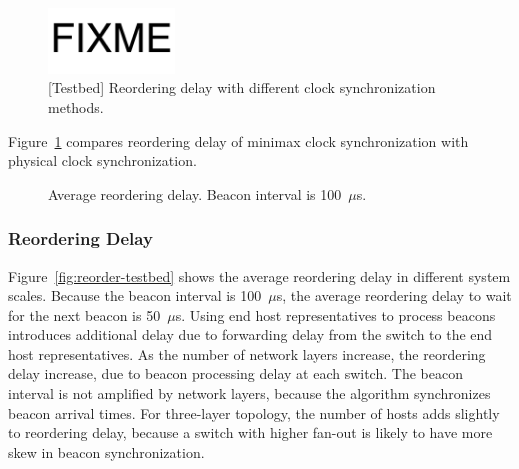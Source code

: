 \begin{figure}[t]
\centering
\includegraphics[width=0.3\textwidth]{images/fixme.pdf}
\caption{[Testbed] Reordering delay with different clock synchronization methods.}
\label{fig:clock-sync}
\end{figure}

Figure~\ref{fig:clock-sync} compares reordering delay of minimax clock synchronization with physical clock synchronization.


\begin{figure}[t]
\centering
	\hspace{0.01\textwidth}
	\caption{Average reordering delay. Beacon interval is 100~$\mu$s.}
    \vspace{-5pt}
\label{fig:reorder-delay}
\end{figure}

\subsubsection{Reordering Delay}
\label{sec:eval-delay}

Figure~\ref{fig:reorder-testbed} shows the average reordering delay in different system scales.
Because the beacon interval is 100~$\mu$s, the average reordering delay to wait for the next beacon is 50~$\mu$s.
Using end host representatives to process beacons introduces additional delay due to forwarding delay from the switch to the end host representatives.
As the number of network layers increase, the reordering delay increase, due to beacon processing delay at each switch.
The beacon interval is not amplified by network layers, because the algorithm synchronizes beacon arrival times.
For three-layer topology, the number of hosts adds slightly to reordering delay, because a switch with higher fan-out is likely to have more skew in beacon synchronization.

